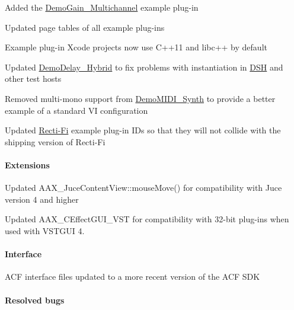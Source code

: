 \begin{DoxyItemize}
\item Added the \hyperlink{a00376_DemoGain_Multichannel}{Demo\+Gain\+\_\+\+Multichannel} example plug-\/in 
\item Updated page tables of all example plug-\/ins 
\item Example plug-\/in Xcode projects now use C++11 and libc++ by default 
\item Updated \hyperlink{a00376_DemoDelay_Hybrid}{Demo\+Delay\+\_\+\+Hybrid} to fix problems with instantiation in \hyperlink{a00365}{D\+S\+H} and other test hosts 
\item Removed multi-\/mono support from \hyperlink{a00376_DemoMIDI_Synth}{Demo\+M\+I\+D\+I\+\_\+\+Synth} to provide a better example of a standard V\+I configuration 
\item Updated \hyperlink{a00376_RectiFi}{Recti-\/\+Fi} example plug-\/in I\+Ds so that they will not collide with the shipping version of Recti-\/\+Fi 
\end{DoxyItemize}\hypertarget{a00375_aax_sdk_2p2p2_Extensions}{}\paragraph{Extensions}\label{a00375_aax_sdk_2p2p2_Extensions}

\begin{DoxyItemize}
\item Updated {\ttfamily A\+A\+X\+\_\+\+Juce\+Content\+View\+::mouse\+Move()} for compatibility with Juce version 4 and higher 
\item Updated {\ttfamily A\+A\+X\+\_\+\+C\+Effect\+G\+U\+I\+\_\+\+V\+S\+T} for compatibility with 32-\/bit plug-\/ins when used with V\+S\+T\+G\+U\+I 4. 
\end{DoxyItemize}\hypertarget{a00375_aax_sdk_2p2p2_Interface}{}\paragraph{Interface}\label{a00375_aax_sdk_2p2p2_Interface}

\begin{DoxyItemize}
\item A\+C\+F interface files updated to a more recent version of the A\+C\+F S\+D\+K 
\end{DoxyItemize}\hypertarget{a00375_aax_sdk_2p2p2_ResolvedBugs}{}\paragraph{Resolved bugs}\label{a00375_aax_sdk_2p2p2_ResolvedBugs}

